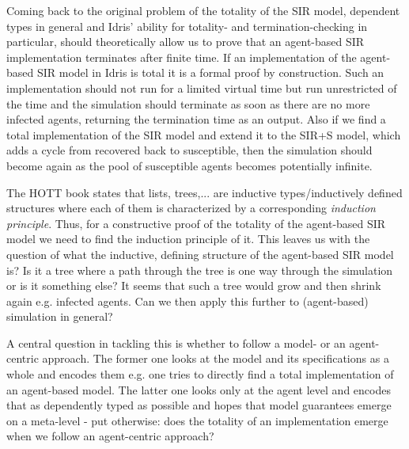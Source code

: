 Coming back to the original problem of the totality of the SIR model, dependent types in general and Idris' ability for totality- and termination-checking in particular, should theoretically allow us to prove that an agent-based SIR implementation terminates after finite time. If an implementation of the agent-based SIR model in Idris is total it is a formal proof by construction. Such an implementation should not run for a limited virtual time but run unrestricted of the time and the simulation should terminate as soon as there are no more infected agents, returning the termination time as an output. Also if we find a total implementation of the SIR model and extend it to the SIR+S model, which adds a cycle from recovered back to susceptible, then the simulation should become again as the pool of susceptible agents becomes potentially infinite.

The HOTT book \cite{program_homotopy_2013} states that lists, trees,... are inductive types/inductively defined structures where each of them is characterized by a corresponding \textit{induction principle}. Thus, for a constructive proof of the totality of the agent-based SIR model we need to find the induction principle of it. This leaves us with the question of what the inductive, defining structure of the agent-based SIR model is? Is it a tree where a path through the tree is one way through the simulation or is it something else? It seems that such a tree would grow and then shrink again e.g. infected agents. Can we then apply this further to (agent-based) simulation in general?

A central question in tackling this is whether to follow a model- or an agent-centric approach. The former one looks at the model and its specifications as a whole and encodes them e.g. one tries to directly find a total implementation of an agent-based model. The latter one looks only at the agent level and encodes that as dependently typed as possible and hopes that model guarantees emerge on a meta-level - put otherwise: does the totality of an implementation emerge when we follow an agent-centric approach? 



